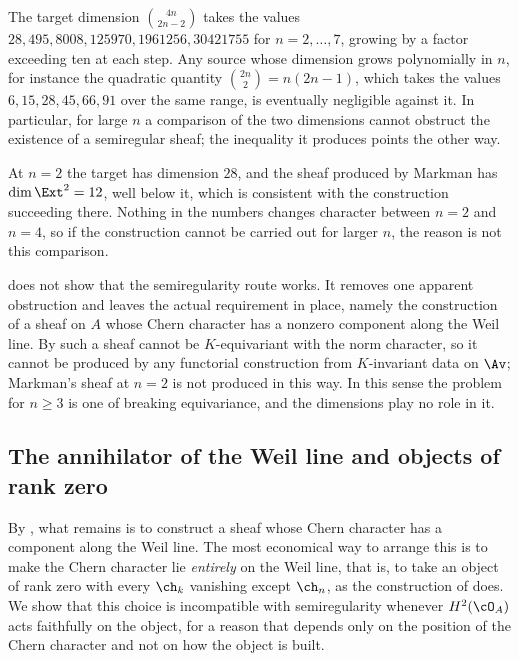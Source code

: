 \begin{corollary}\label{cor:countnotbind}
The target dimension $\binom{4n}{2n-2}$ takes the values
$28,495,8008,125970,1961256,30421755$ for $n=2,\dots,7$, growing by a factor
exceeding ten at each step. Any source whose dimension grows polynomially in
$n$, for instance the quadratic quantity $\binom{2n}{2}=n(2n-1)$, which takes
the values $6,15,28,45,66,91$ over the same range, is eventually negligible
against it. In particular, for large $n$ a comparison of the two dimensions
cannot obstruct the existence of a semiregular sheaf; the inequality it
produces points the other way.
\end{corollary}

\begin{remark}[Consistency at $n=2$]\label{rem:markmanconsistent}
At $n=2$ the target has dimension $28$, and the sheaf produced by Markman has
$\dim\Ext^{2}=12$, well below it, which is consistent with the construction
succeeding there. Nothing in the numbers changes character between $n=2$ and
$n=4$, so if the construction cannot be carried out for larger $n$, the reason
is not this comparison.
\end{remark}

\begin{remark}\label{rem:semiregneed}
 does not show that the semiregularity route works.
It removes one apparent obstruction and leaves the actual requirement in
place, namely the construction of a sheaf on $A$ whose Chern character has a
nonzero component along the Weil line. By  such a sheaf
cannot be $K$-equivariant with the norm character, so it cannot be produced
by any functorial construction from $K$-invariant data on $\Av$; Markman's
sheaf at $n=2$ is not produced in this way. In this sense the problem for
$n\ge3$ is one of breaking equivariance, and the dimensions play no role in
it.
\end{remark}

\subsection{The annihilator of the Weil line and objects of rank zero}
\label{ssec:rankzero}

By , what remains is to construct a sheaf whose Chern
character has a component along the Weil line. The most economical way to
arrange this is to make the Chern character lie \emph{entirely} on the Weil
line, that is, to take an object of rank zero with every $\ch_{k}$ vanishing
except $\ch_{n}$, as the construction of  does. We show
that this choice is incompatible with semiregularity whenever $H^{2}(\cO_{A})$
acts faithfully on the object, for a reason that depends only on the position
of the Chern character and not on how the object is built.

